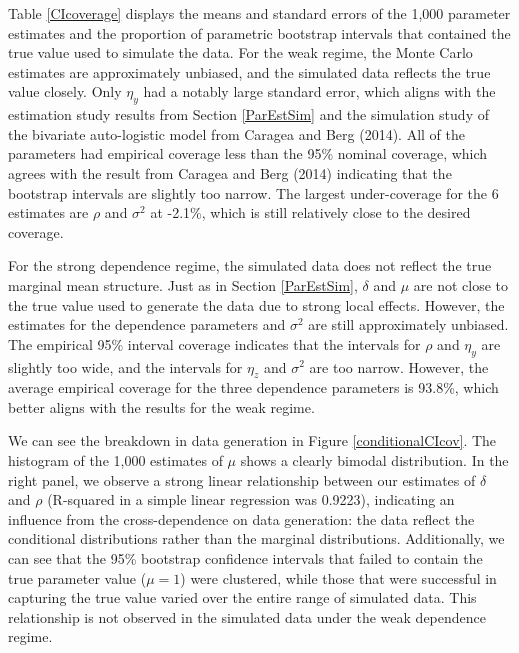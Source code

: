 \documentclass[12pt, a4paper, twoside]{article}
\begin{document}
Table \ref{CIcoverage} displays the means and standard errors of the 1,000 parameter estimates and the proportion of parametric bootstrap intervals that contained the true value used to simulate the data. For the weak regime, the Monte Carlo estimates are approximately unbiased, and the simulated data reflects the true value closely. Only $\eta_y$ had a notably large standard error, which aligns with the estimation study results from Section \ref{ParEstSim} and the simulation study of the bivariate auto-logistic model from Caragea and Berg (2014). All of the parameters had empirical coverage less than the 95\% nominal coverage, which agrees with the result from Caragea and Berg (2014) indicating that the bootstrap intervals are slightly too narrow. The largest under-coverage for the 6 estimates are $\rho$ and $\sigma^2$ at -2.1\%, which is still relatively close to the desired coverage.

For the strong dependence regime, the simulated data does not reflect the true marginal mean structure. Just as in Section \ref{ParEstSim}, $\delta$ and $\mu$ are not close to the true value used to generate the data due to strong local effects. However, the estimates for the dependence parameters and $\sigma^2$ are still approximately unbiased. The empirical 95\% interval coverage indicates that the intervals for $\rho$ and $\eta_y$ are slightly too wide, and the intervals for $\eta_z$ and $\sigma^2$ are too narrow. However, the average empirical coverage for the three dependence parameters is 93.8\%, which better aligns with the results for the weak regime.

We can see the breakdown in data generation in Figure \ref{conditionalCIcov}. The histogram of the 1,000 estimates of $\mu$ shows a clearly bimodal distribution. In the right panel, we observe a strong linear relationship between our estimates of $\delta$ and $\rho$ (R-squared in a simple linear regression was 0.9223), indicating an influence from the cross-dependence on data generation: the data reflect the conditional distributions rather than the marginal distributions. Additionally, we can see that the 95\% bootstrap confidence intervals that failed to contain the true parameter value ($\mu=1$) were clustered, while those that were successful in capturing the true value varied over the entire range of simulated data. This relationship is not observed in the simulated data under the weak dependence regime.
\end{document}
